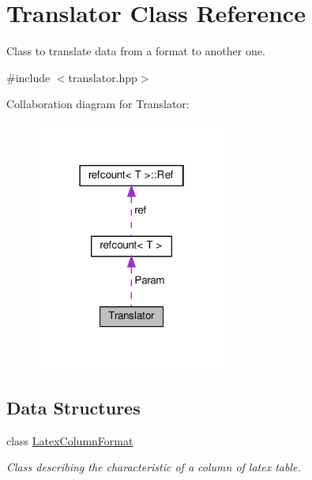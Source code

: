 \hypertarget{classTranslator}{}\section{Translator Class Reference}
\label{classTranslator}


Class to translate data from a format to another one.  




{\ttfamily \#include $<$translator.\+hpp$>$}



Collaboration diagram for Translator\+:
\nopagebreak
\begin{figure}[H]
\begin{center}
\leavevmode
\includegraphics[width=178pt]{da/dd4/classTranslator__coll__graph}
\end{center}
\end{figure}
\subsection*{Data Structures}
\begin{DoxyCompactItemize}
\item 
class \hyperlink{classTranslator_1_1LatexColumnFormat}{Latex\+Column\+Format}
\begin{DoxyCompactList}\small\item\em Class describing the characteristic of a column of latex table. \end{DoxyCompactList}\end{DoxyCompactItemize}
